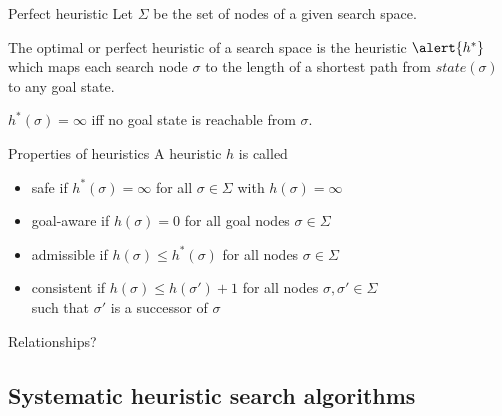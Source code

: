 \documentclass{gkibeamer}
\begin{document}
\begin{frame}{Perfect heuristic}
  Let $\Sigma$ be the set of nodes of a given search space.

  \begin{definition}
    The \alert{optimal} or \alert{perfect heuristic} of a search space
    is the heuristic $\alert{h^*}$ which maps each search node
    $\sigma$ to the length of a shortest path from
    $\textit{state}(\sigma)$ to any goal state.
  \end{definition}
   $h^*(\sigma) = \infty$ iff no goal state is reachable
  from $\sigma$.
\end{frame}

\begin{frame}{Properties of heuristics}
  A heuristic $h$ is called
  \begin{itemize}
  \item \alert{safe} if
    $h^*(\sigma) = \infty$ for all $\sigma \in \Sigma$
    with $h(\sigma) = \infty$
  \item \alert{goal-aware} if
    $h(\sigma) = 0$ for all goal nodes $\sigma \in \Sigma$
  \item \alert{admissible} if
    $h(\sigma) \le h^*(\sigma)$ for all nodes $\sigma \in \Sigma$
  \item \alert{consistent} if
    $h(\sigma) \le h(\sigma') + 1$ for all nodes
    $\sigma, \sigma' \in \Sigma$ \\
    such that $\sigma'$ is a successor of $\sigma$
  \end{itemize}

  \medskip

  Relationships?
\end{frame}

\subsection[Systematic search]{Systematic heuristic search algorithms}
\end{document}
